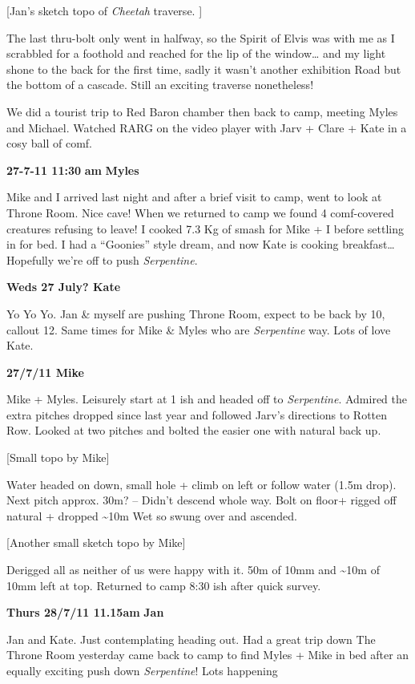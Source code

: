 {[}Jan's sketch topo of \emph{Cheetah} traverse. {]}

The last thru-bolt only went in halfway, so the Spirit of Elvis was with
me as I scrabbled for a foothold and reached for the lip of the
window\ldots{} and my light shone to the back for the first time, sadly
it wasn't another exhibition Road but the bottom of a cascade. Still an
exciting traverse nonetheless!

We did a tourist trip to Red Baron chamber then back to camp, meeting
Myles and Michael. Watched RARG on the video player with Jarv + Clare +
Kate in a cosy ball of comf.

\textbf{27-7-11 11:30} \textbf{am} \textbf{Myles}

Mike and I arrived last night and after a brief visit to camp, went to
look at Throne Room. Nice cave! When we returned to camp we found 4
comf-covered creatures refusing to leave! I cooked 7.3 Kg of smash for
Mike + I before settling in for bed. I had a ``Goonies'' style dream,
and now Kate is cooking breakfast\ldots{} Hopefully we're off to push
\emph{Serpentine}.

\textbf{Weds 27 July? Kate}

Yo Yo Yo. Jan \& myself are pushing Throne Room, expect to be back by
10, callout 12. Same times for Mike \& Myles who are \emph{Serpentine}
way. Lots of love Kate.

\textbf{27/7/11 Mike}

Mike + Myles. Leisurely start at 1 ish and headed off to
\emph{Serpentine}. Admired the extra pitches dropped since last year and
followed Jarv's directions to Rotten Row. Looked at two pitches and
bolted the easier one with natural back up.

{[}Small topo by Mike{]}

Water headed on down, small hole + climb on left or follow water (1.5m
drop). Next pitch approx. 30m? -- Didn't descend whole way. Bolt on
floor+ rigged off natural + dropped \textasciitilde{}10m Wet so swung
over and ascended.

{[}Another small sketch topo by Mike{]}

Derigged all as neither of us were happy with it. 50m of 10mm and
\textasciitilde{}10m of 10mm left at top. Returned to camp 8:30 ish
after quick survey.

\textbf{Thurs 28/7/11 11.15am} \textbf{Jan}

Jan and Kate. Just contemplating heading out. Had a great trip down The
Throne Room yesterday came back to camp to find Myles + Mike in bed
after an equally exciting push down \emph{Serpentine}! Lots happening

